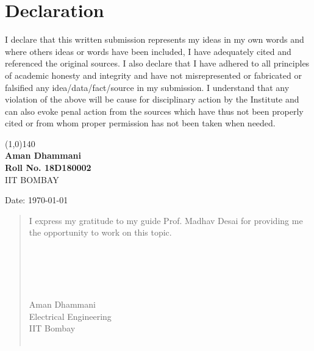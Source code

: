 \documentclass[a4paper,12pt, final]{report}
\begin{document}
\newpage
{}
 \linespread{1.5}
\chapter*{Declaration}
I declare that this written submission represents my ideas in my own words and where others ideas or words have been included, I have adequately cited and referenced the original sources.
\newline
\newline
I also declare that I have adhered to all principles of academic honesty and integrity and have not misrepresented or fabricated or falsified any idea/data/fact/source in my submission. I understand that any violation of the above will be cause for disciplinary action by the Institute and can also evoke penal action from the sources which have thus not been  properly cited or from whom proper permission has not been taken when needed.

\vspace{3.0cm}
\begin{flushright}
\line(1,0){140}\\
\vspace*{10pt}
\textbf{Aman Dhammani} \\
\textbf{Roll No. 18D180002} \\
IIT BOMBAY
\end{flushright}
\begin{flushleft}
Date: \today
\end{flushleft}

\newpage

\renewcommand{\abstractname}{Acknowledgement}
\begin{abstract}
I express my gratitude to my guide Prof. Madhav Desai for providing me the opportunity to work on this topic. 
\\\\
\\\\
\\\\
Aman Dhammani\\
Electrical Engineering\\
IIT Bombay\\\

\end{abstract}
\end{document}
